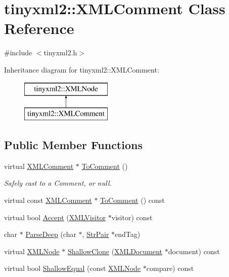 \hypertarget{classtinyxml2_1_1_x_m_l_comment}{\section{tinyxml2\-:\-:X\-M\-L\-Comment Class Reference}
\label{classtinyxml2_1_1_x_m_l_comment}
}


{\ttfamily \#include $<$tinyxml2.\-h$>$}

Inheritance diagram for tinyxml2\-:\-:X\-M\-L\-Comment\-:\begin{figure}[H]
\begin{center}
\leavevmode
\includegraphics[height=2.000000cm]{classtinyxml2_1_1_x_m_l_comment}
\end{center}
\end{figure}
\subsection*{Public Member Functions}
\begin{DoxyCompactItemize}
\item 
virtual \hyperlink{classtinyxml2_1_1_x_m_l_comment}{X\-M\-L\-Comment} $\ast$ \hyperlink{classtinyxml2_1_1_x_m_l_comment_a8093e1dc8a34fa446d9dc3fde0e6c0ee}{To\-Comment} ()
\begin{DoxyCompactList}\small\item\em Safely cast to a Comment, or null. \end{DoxyCompactList}\item 
virtual const \hyperlink{classtinyxml2_1_1_x_m_l_comment}{X\-M\-L\-Comment} $\ast$ \hyperlink{classtinyxml2_1_1_x_m_l_comment_a422aabac22de7d9c9cad130897dd8b1c}{To\-Comment} () const 
\item 
virtual bool \hyperlink{classtinyxml2_1_1_x_m_l_comment_aa382b1be6a8b0650c16a2d88bb499335}{Accept} (\hyperlink{classtinyxml2_1_1_x_m_l_visitor}{X\-M\-L\-Visitor} $\ast$visitor) const 
\item 
char $\ast$ \hyperlink{classtinyxml2_1_1_x_m_l_comment_aa6ab35c3bb1c1840371dc32a2040c57f}{Parse\-Deep} (char $\ast$, \hyperlink{classtinyxml2_1_1_str_pair}{Str\-Pair} $\ast$end\-Tag)
\item 
virtual \hyperlink{classtinyxml2_1_1_x_m_l_node}{X\-M\-L\-Node} $\ast$ \hyperlink{classtinyxml2_1_1_x_m_l_comment_a90bb60193a691b484f5e1b487857016d}{Shallow\-Clone} (\hyperlink{classtinyxml2_1_1_x_m_l_document}{X\-M\-L\-Document} $\ast$document) const 
\item 
virtual bool \hyperlink{classtinyxml2_1_1_x_m_l_comment_a2d9f26757b0018fce933e74420cda22a}{Shallow\-Equal} (const \hyperlink{classtinyxml2_1_1_x_m_l_node}{X\-M\-L\-Node} $\ast$compare) const 
\end{DoxyCompactItemize}
